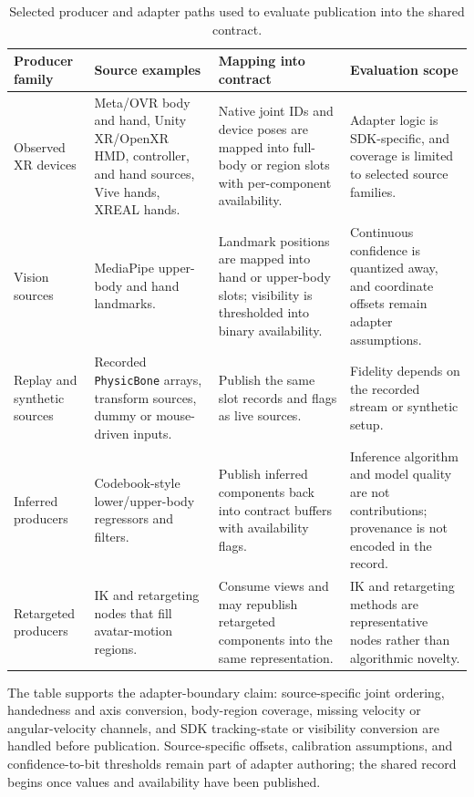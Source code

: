 \documentclass[runningheads]{llncs}
\begin{document}
\begin{table}[t]
\caption{Selected producer and adapter paths used to evaluate publication into the shared contract.}\label{tab:producers}
\centering
\scriptsize
\begin{tabular}{@{}P{24mm}P{25mm}P{35mm}P{35mm}@{}}
\toprule
Producer family & Source examples & Mapping into contract & Evaluation scope \\
\midrule
Observed XR devices & Meta/OVR body and hand, Unity XR/OpenXR HMD, controller, and hand sources, Vive hands, XREAL hands. & Native joint IDs and device poses are mapped into full-body or region slots with per-component availability. & Adapter logic is SDK-specific, and coverage is limited to selected source families. \\
Vision sources & MediaPipe upper-body and hand landmarks. & Landmark positions are mapped into hand or upper-body slots; visibility is thresholded into binary availability. & Continuous confidence is quantized away, and coordinate offsets remain adapter assumptions. \\
Replay and synthetic sources & Recorded \texttt{PhysicBone} arrays, transform sources, dummy or mouse-driven inputs. & Publish the same slot records and flags as live sources. & Fidelity depends on the recorded stream or synthetic setup. \\
Inferred producers & Codebook-style lower/upper-body regressors and filters. & Publish inferred components back into contract buffers with availability flags. & Inference algorithm and model quality are not contributions; provenance is not encoded in the record. \\
Retargeted producers & IK and retargeting nodes that fill avatar-motion regions. & Consume views and may republish retargeted components into the same representation. & IK and retargeting methods are representative nodes rather than algorithmic novelty. \\
\bottomrule
\end{tabular}
\end{table}

The table supports the adapter-boundary claim: source-specific joint ordering, handedness and axis conversion, body-region coverage, missing velocity or angular-velocity channels, and SDK tracking-state or visibility conversion are handled before publication. Source-specific offsets, calibration assumptions, and confidence-to-bit thresholds remain part of adapter authoring; the shared record begins once values and availability have been published.
\end{document}
